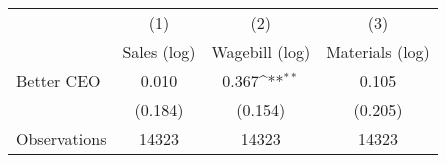 {
\def\sym#1{\ifmmode^{#1}\else\(^{#1}\)\fi}
\begin{tabular}{l*{3}{c}}
\hline\hline
                    &\multicolumn{1}{c}{(1)}&\multicolumn{1}{c}{(2)}&\multicolumn{1}{c}{(3)}\\
                    &\multicolumn{1}{c}{Sales (log)}&\multicolumn{1}{c}{Wagebill (log)}&\multicolumn{1}{c}{Materials (log)}\\
\hline
Better CEO          &       0.010         &       0.367\sym{**} &       0.105         \\
                    &     (0.184)         &     (0.154)         &     (0.205)         \\
\hline
Observations        &       14323         &       14323         &       14323         \\
\hline\hline
\end{tabular}
}
